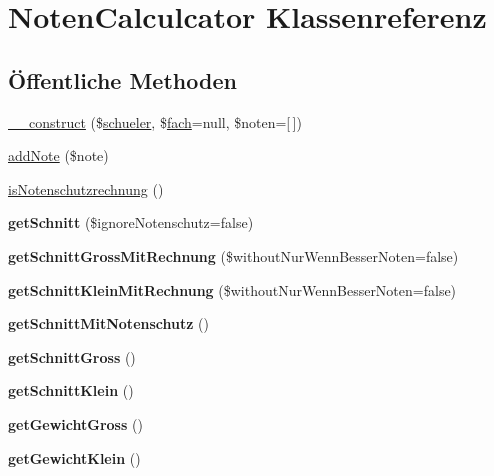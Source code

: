 \hypertarget{class_noten_calculcator}{}\section{Noten\+Calculcator Klassenreferenz}
\label{class_noten_calculcator}
\subsection*{Öffentliche Methoden}
\begin{DoxyCompactItemize}
\item 
\mbox{\hyperlink{class_noten_calculcator_a48401c29bf720d9363b55a17f478cf96}{\+\_\+\+\_\+construct}} (\$\mbox{\hyperlink{classschueler}{schueler}}, \$\mbox{\hyperlink{classfach}{fach}}=null, \$noten=\mbox{[}$\,$\mbox{]})
\item 
\mbox{\hyperlink{class_noten_calculcator_a8e3ba962241c29afe3f7e45d8879eefc}{add\+Note}} (\$note)
\item 
\mbox{\hyperlink{class_noten_calculcator_a0b1296c8095351beaf397356c0061c3d}{is\+Notenschutzrechnung}} ()
\item 
\mbox{\label{class_noten_calculcator_a8f2aa719c0314d18c75fde4f47608b5d}} 
{\bfseries get\+Schnitt} (\$ignore\+Notenschutz=false)
\item 
\mbox{\label{class_noten_calculcator_a9b9c52b8fd27d92b75c9eb9448996d92}} 
{\bfseries get\+Schnitt\+Gross\+Mit\+Rechnung} (\$without\+Nur\+Wenn\+Besser\+Noten=false)
\item 
\mbox{\label{class_noten_calculcator_a32ebfd708f6ac49a729211ebb61deea9}} 
{\bfseries get\+Schnitt\+Klein\+Mit\+Rechnung} (\$without\+Nur\+Wenn\+Besser\+Noten=false)
\item 
\mbox{\label{class_noten_calculcator_abd0998341b9c3328d804bf6c3ab07819}} 
{\bfseries get\+Schnitt\+Mit\+Notenschutz} ()
\item 
\mbox{\label{class_noten_calculcator_a1c2180012a827dec71ab82097b74c591}} 
{\bfseries get\+Schnitt\+Gross} ()
\item 
\mbox{\label{class_noten_calculcator_afa1f12389a31eea4a4ed35ba63bbe3c7}} 
{\bfseries get\+Schnitt\+Klein} ()
\item 
\mbox{\label{class_noten_calculcator_a767ddd0028f4dde090f62da3056a5e34}} 
{\bfseries get\+Gewicht\+Gross} ()
\item 
\mbox{\label{class_noten_calculcator_a06b3a784fe81d1577a6c7744dcb27b3b}} 
{\bfseries get\+Gewicht\+Klein} ()
\end{DoxyCompactItemize}
